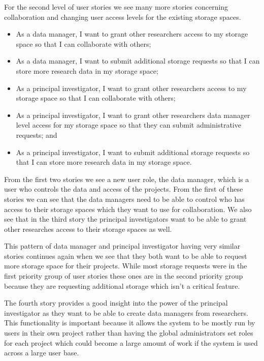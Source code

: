 \documentclass[a4paper,titlepage,12pt]{article}
\begin{document}
For the second level of user stories we see many more stories concerning
collaboration and changing user access levels for the existing storage spaces.

\begin{itemize}
	\item As a data manager, I want to grant other researchers access to my
	      storage space so that I can collaborate with others;
	\item As a data manager, I want to submit additional storage requests
	      so that I can store more research data in my storage space;
	\item As a principal investigator, I want to grant other researchers
	      access to my storage space so that I can collaborate with others;
	\item As a principal investigator, I want to grant other researchers
	      data manager level access for my storage space so that they can
	      submit administrative requests; and
	\item As a principal investigator, I want to submit additional storage
	      requests so that I can store more research data in my storage
	      space.
\end{itemize}

From the first two stories we see a new user role, the data manager, which is a
user who controls the data and access of the projects. From the first of these
stories we can see that the data managers need to be able to control who has
access to their storage spaces which they want to use for collaboration. We
also see that in the third story the principal investigators want to be able to
grant other researches access to their storage spaces as well.

This pattern of data manager and principal investigator having very similar
stories continues again when we see that they both want to be able to request
more storage space for their projects. While most storage requests were in the
first priority group of user stories these ones are in the second priority
group because they are requesting additional storage which isn't a critical
feature.

The fourth story provides a good insight into the power of the principal
investigator as they want to be able to create data managers from researchers.
This functionality is important because it allows the system to be mostly run
by users in their own project rather than having the global administrators set
roles for each project which could become a large amount of work if the system
is used across a large user base.
\end{document}
